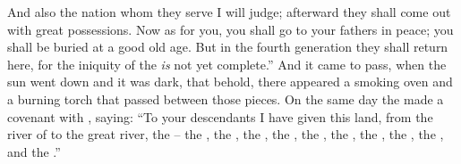 \bverse And also the nation whom they serve I will judge; afterward they shall come out with great possessions.
\bverse Now as for you, you shall go to your fathers in peace; you shall be buried at a good old age.
\bverse But in the fourth generation they shall return here, for the iniquity of the  \textit{is} not yet complete.''
\bverse And it came to pass, when the sun went down and it was dark, that behold, there appeared a smoking oven and a burning torch that passed between those pieces.
\bverse On the same day the \lord made a covenant with , saying:
\bverse ``To your descendants I have given this land, from the river of  to the great river, the --
\bverse the , the , the ,
\bverse the , the , the , the , the , the , and the .''
